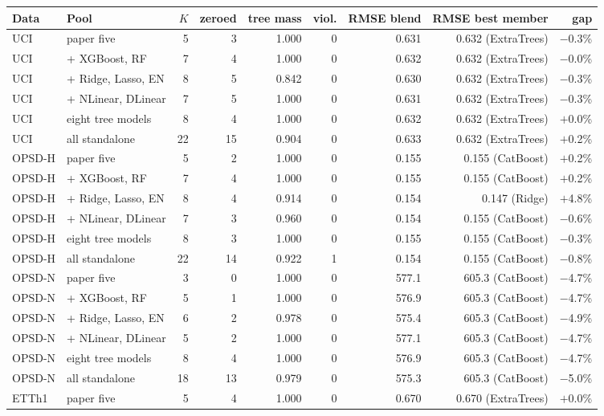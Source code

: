 \begin{tabular}{llrrrrrrr}
\toprule
Data & Pool & $K$ & zeroed & tree mass & viol. & RMSE blend & RMSE best member & gap \\
\midrule
UCI & paper five & 5 & 3 & 1.000 & 0 & 0.631 & 0.632 (ExtraTrees) & $-$0.3\% \\
UCI & + XGBoost, RF & 7 & 4 & 1.000 & 0 & 0.632 & 0.632 (ExtraTrees) & $-$0.0\% \\
UCI & + Ridge, Lasso, EN & 8 & 5 & 0.842 & 0 & 0.630 & 0.632 (ExtraTrees) & $-$0.3\% \\
UCI & + NLinear, DLinear & 7 & 5 & 1.000 & 0 & 0.631 & 0.632 (ExtraTrees) & $-$0.3\% \\
UCI & eight tree models & 8 & 4 & 1.000 & 0 & 0.632 & 0.632 (ExtraTrees) & $+$0.0\% \\
UCI & all standalone & 22 & 15 & 0.904 & 0 & 0.633 & 0.632 (ExtraTrees) & $+$0.2\% \\
OPSD-H & paper five & 5 & 2 & 1.000 & 0 & 0.155 & 0.155 (CatBoost) & $+$0.2\% \\
OPSD-H & + XGBoost, RF & 7 & 4 & 1.000 & 0 & 0.155 & 0.155 (CatBoost) & $+$0.2\% \\
OPSD-H & + Ridge, Lasso, EN & 8 & 4 & 0.914 & 0 & 0.154 & 0.147 (Ridge) & $+$4.8\% \\
OPSD-H & + NLinear, DLinear & 7 & 3 & 0.960 & 0 & 0.154 & 0.155 (CatBoost) & $-$0.6\% \\
OPSD-H & eight tree models & 8 & 3 & 1.000 & 0 & 0.155 & 0.155 (CatBoost) & $-$0.3\% \\
OPSD-H & all standalone & 22 & 14 & 0.922 & 1 & 0.154 & 0.155 (CatBoost) & $-$0.8\% \\
OPSD-N & paper five & 3 & 0 & 1.000 & 0 & 577.1 & 605.3 (CatBoost) & $-$4.7\% \\
OPSD-N & + XGBoost, RF & 5 & 1 & 1.000 & 0 & 576.9 & 605.3 (CatBoost) & $-$4.7\% \\
OPSD-N & + Ridge, Lasso, EN & 6 & 2 & 0.978 & 0 & 575.4 & 605.3 (CatBoost) & $-$4.9\% \\
OPSD-N & + NLinear, DLinear & 5 & 2 & 1.000 & 0 & 577.1 & 605.3 (CatBoost) & $-$4.7\% \\
OPSD-N & eight tree models & 8 & 4 & 1.000 & 0 & 576.9 & 605.3 (CatBoost) & $-$4.7\% \\
OPSD-N & all standalone & 18 & 13 & 0.979 & 0 & 575.3 & 605.3 (CatBoost) & $-$5.0\% \\
ETTh1 & paper five & 5 & 4 & 1.000 & 0 & 0.670 & 0.670 (ExtraTrees) & $+$0.0\% \\

\end{tabular}
